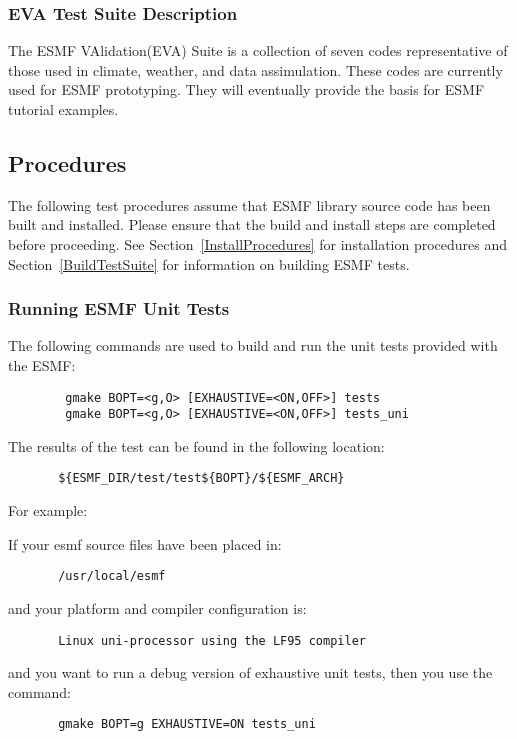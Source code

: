 \subsubsection{EVA Test Suite Description}
\label{EVATestDescription}

The ESMF VAlidation(EVA) Suite is a collection of seven codes representative of those used in climate, weather, and data assimulation. These codes are currently used for ESMF prototyping. They will eventually provide the basis for ESMF tutorial examples.

\subsection{Procedures}
\label{TestingProcedures}

The following test procedures assume that ESMF library source code has been built and installed. Please ensure that the build and install steps are completed before proceeding. See Section~\ref{InstallProcedures} for installation procedures and Section~\ref{BuildTestSuite} for information on building ESMF tests.  

\subsubsection{Running ESMF Unit Tests}
\label{RunUnitTests}

The following commands are used to build and run the unit tests provided with the ESMF:
\begin{verbatim}
        gmake BOPT=<g,O> [EXHAUSTIVE=<ON,OFF>] tests
        gmake BOPT=<g,O> [EXHAUSTIVE=<ON,OFF>] tests_uni
\end{verbatim}

The results of the test can be found in the following location:
\begin{verbatim}
       ${ESMF_DIR/test/test${BOPT}/${ESMF_ARCH}
\end{verbatim}

For example: 

If your esmf source files have been placed in: 
\begin{verbatim}
       /usr/local/esmf
\end{verbatim}

and your platform and compiler configuration is:
\begin{verbatim}
       Linux uni-processor using the LF95 compiler
\end{verbatim}

and you want to run a debug version of exhaustive unit tests,
then you use the command:
\begin{verbatim}
       gmake BOPT=g EXHAUSTIVE=ON tests_uni
\end{verbatim}

